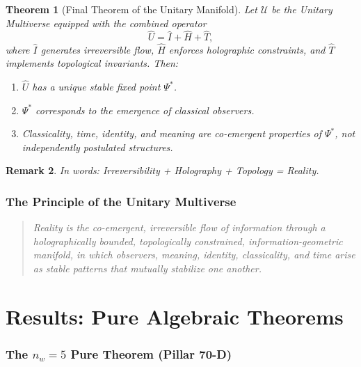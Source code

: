 \documentclass[12pt,a4paper]{article}
\newtheorem{theorem}{Theorem}[section]
\newtheorem{remark}[theorem]{Remark}
\begin{document}
\begin{theorem}[Final Theorem of the Unitary Manifold]
  Let $\mathcal{U}$ be the Unitary Multiverse equipped with the combined
  operator
  \begin{equation}
    \hat{U} = \hat{I} + \hat{H} + \hat{T} ,
    \label{eq:U-operator}
  \end{equation}
  where $\hat{I}$ generates irreversible flow, $\hat{H}$ enforces holographic
  constraints, and $\hat{T}$ implements topological invariants.  Then:
  \begin{enumerate}
    \item $\hat{U}$ has a unique stable fixed point $\Psi^*$.
    \item $\Psi^*$ corresponds to the emergence of classical observers.
    \item Classicality, time, identity, and meaning are co-emergent properties
          of $\Psi^*$, not independently postulated structures.
  \end{enumerate}
\end{theorem}

\begin{remark}
  In words: \textit{Irreversibility + Holography + Topology = Reality.}
\end{remark}

\section{The Principle of the Unitary Multiverse}
\label{sec:principle}

\begin{quote}
  \textit{Reality is the co-emergent, irreversible flow of information through a
  holographically bounded, topologically constrained, information-geometric
  manifold, in which observers, meaning, identity, classicality, and time arise
  as stable patterns that mutually stabilize one another.}
\end{quote}

\part{Results: Pure Algebraic Theorems}

\section{The \texorpdfstring{$n_w = 5$}{nw=5} Pure Theorem (Pillar 70-D)}
\label{sec:nw5-theorem}
\end{document}
